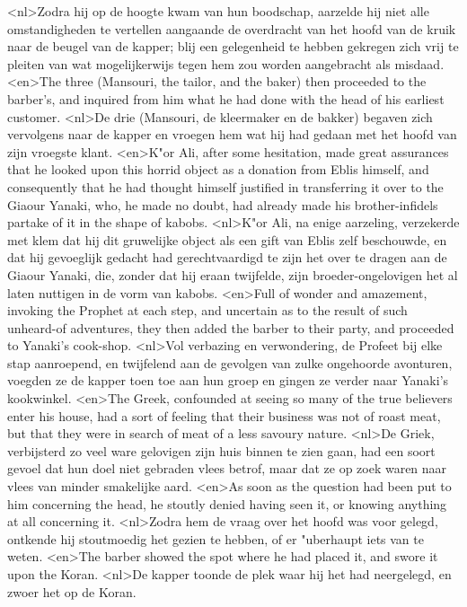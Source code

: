 <nl>Zodra hij op de hoogte kwam van hun boodschap, aarzelde hij niet alle omstandigheden te vertellen aangaande de overdracht van het hoofd van de kruik naar de beugel van de kapper; blij  een gelegenheid te hebben gekregen  zich vrij te pleiten  van wat mogelijkerwijs tegen hem zou worden aangebracht  als misdaad.
<en>The three (Mansouri, the tailor, and the baker) then proceeded to the barber's, and inquired from him what he had done with the head of his earliest customer.
<nl>De drie (Mansouri, de kleermaker en de bakker) begaven zich vervolgens naar de kapper en vroegen hem wat hij had gedaan met het hoofd van zijn vroegste klant.
<en>K"or Ali, after some hesitation, made great assurances that he looked upon this horrid object as a donation from Eblis himself, and consequently that he had thought himself justified in transferring it over to the Giaour Yanaki, who, he made no doubt, had already made his brother-infidels partake of it in the shape of kabobs.
<nl>K"or Ali, na enige aarzeling, verzekerde met klem dat hij dit gruwelijke object als een gift van Eblis zelf beschouwde, en dat hij gevoeglijk gedacht had gerechtvaardigd te zijn  het over te dragen aan de Giaour Yanaki, die, zonder dat hij eraan twijfelde,  zijn broeder-ongelovigen het al laten nuttigen in de vorm van kabobs.
<en>Full of wonder and amazement, invoking the Prophet at each step, and uncertain as to the result of such unheard-of adventures, they then added the barber to their party, and proceeded to Yanaki's cook-shop.
<nl>Vol verbazing en verwondering, de Profeet bij elke stap aanroepend, en twijfelend  aan de gevolgen van zulke ongehoorde avonturen, voegden ze de kapper toen toe aan hun  groep en gingen ze verder naar Yanaki's kookwinkel.
<en>The Greek, confounded at seeing so many of the true believers enter his house, had a sort of feeling that their business was not of roast meat, but that they were in search of meat of a less savoury nature.
<nl>De Griek, verbijsterd zo veel  ware gelovigen zijn huis binnen te zien gaan, had een soort gevoel dat hun doel niet gebraden vlees betrof, maar dat ze op zoek waren naar vlees van minder smakelijke aard.
<en>As soon as the question had been put to him concerning the head, he stoutly denied having seen it, or knowing anything at all concerning it.
<nl>Zodra hem de vraag  over het hoofd was voor gelegd, ontkende hij stoutmoedig het  gezien te hebben,  of er "uberhaupt iets van te weten.
<en>The barber showed the spot where he had placed it, and swore it upon the Koran.
<nl>De kapper toonde de plek waar hij het had neergelegd, en zwoer het op de Koran.
